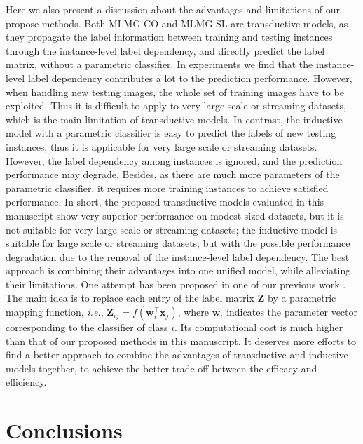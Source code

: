 \documentclass[twocolumn]{svjour3}          %
\newcommand{\w}{\mathbf{w}}
\newcommand{\x}{\mathbf{x}}
\newcommand{\Z}{\mathbf{Z}}
\begin{document}
Here we also present a discussion about the advantages and limitations of our propose methods. Both MLMG-CO and MLMG-SL are transductive models, as they propagate the label information between training and testing instances through the instance-level label dependency, and directly predict the label matrix, without a parametric classifier. In experiments we find that the instance-level label dependency contributes a lot to the prediction performance. However, when handling new testing images, the whole set of training images have to be exploited. Thus it is difficult to apply to very large scale or streaming datasets, which is the main limitation of transductive models. 
In contrast, the inductive model with a parametric classifier is easy to predict the labels of new testing instances, thus it is applicable for very large scale or streaming datasets. However, the label dependency among instances is ignored, and the prediction performance may degrade. Besides, as there are much more parameters of the parametric classifier, it requires more training instances to achieve satisfied performance. 
In short, the proposed transductive models evaluated in this manuscript show very superior performance on modest sized datasets, but it is not suitable for very large scale or streaming datasets; the inductive model is suitable for large scale or streaming datasets, but with the possible performance degradation due to the removal of the instance-level label dependency. 
The best approach is combining their advantages into one unified model, while alleviating their limitations. One attempt has been proposed in one of our previous work \cite{my-pr-2015}. The main idea is to replace each entry of the label matrix $\Z$ by a parametric mapping function, {\it i.e.}, $\Z_{ij} = f(\w_i^\top \x_j)$, where $\w_i$ indicates the parameter vector corresponding to the classifier of class $i$. Its computational cost is much higher than that of our proposed methods in this manuscript. 
It deserves more efforts to find a better approach to combine the advantages of transductive and inductive models together, to achieve the better trade-off between the efficacy and efficiency. 

\section{Conclusions}\label{sec: conclusion}
\end{document}
